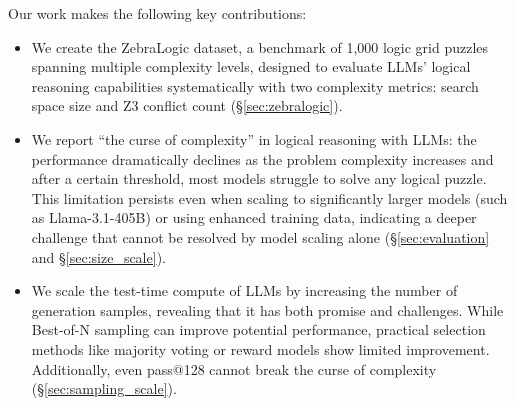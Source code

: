 
Our work makes the following key contributions:
\begin{itemize}[leftmargin=*,itemsep=0pt,parsep=0pt,topsep=0pt,partopsep=0pt]
    \item We create the ZebraLogic dataset, a benchmark of 1,000 logic grid puzzles spanning multiple complexity levels, designed to evaluate LLMs' logical reasoning capabilities systematically with two complexity metrics: search space size and Z3 conflict count (\S\ref{sec:zebralogic}).
    
    \item We report ``the curse of complexity'' in logical reasoning with LLMs: the performance dramatically declines as the problem complexity increases and after a certain threshold, most models struggle to solve any logical puzzle.  
    This limitation persists even when scaling to significantly larger models (such as Llama-3.1-405B) or using enhanced training data, indicating a deeper challenge that cannot be resolved by model scaling alone (\S\ref{sec:evaluation} and \S\ref{sec:size_scale}).
    
    \item We scale the test-time compute of LLMs by increasing the number of generation samples, revealing that it has both promise and challenges. While Best-of-N sampling can improve potential performance, practical selection methods like majority voting or reward models show limited improvement. Additionally, even pass@128 cannot break the curse of complexity (\S\ref{sec:sampling_scale}).
    

\end{itemize}
